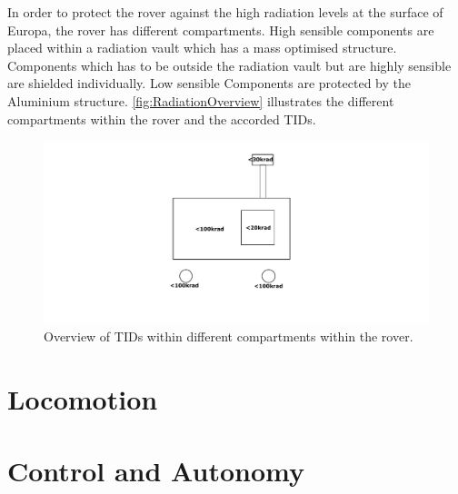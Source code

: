 In order to protect the rover against the high radiation levels at the surface of Europa, the rover has different compartments. High sensible components are placed within a radiation vault which has a mass optimised structure. Components which has to be outside the radiation vault but are highly sensible are shielded individually. Low sensible Components are protected by the Aluminium structure. \autoref{fig:RadiationOverview} illustrates the different compartments within the rover and the accorded TIDs.

\begin{figure}[htb]
     \centering
     \includegraphics[width=\textwidth]{Media/RadiationOverview}
     \caption{Overview of TIDs within different compartments within the rover.}
     \label{fig:RadiationOverview}
\end{figure}

\clearpage

\section{Locomotion}
\label{sec:locomotion}



\section{Control and Autonomy}
\label{sec:ControlandAutonomy}

\cleardoublepage